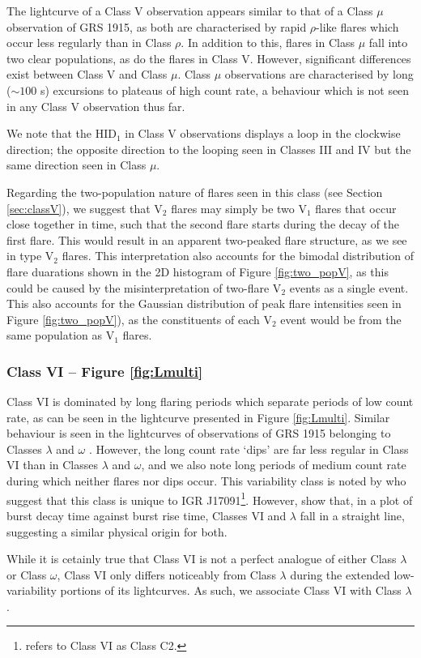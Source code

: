 \par The lightcurve of a Class V observation appears similar to that of a Class $\mu$ observation of GRS 1915, as both are characterised by rapid $\rho$-like flares which occur less regularly than in Class $\rho$.  In addition to this, flares in Class $\mu$ fall into two clear populations, as do the flares in Class V.  However, significant differences exist between Class V and Class $\mu$.  Class $\mu$ observations are characterised by long ($\sim100$ s) excursions to plateaus of high count rate, a behaviour which is not seen in any Class V observation thus far.
\par We note that the HID$_1$ in Class V observations displays a loop in the clockwise direction; the opposite direction to the looping seen in Classes III and IV but the same direction seen in Class $\mu$.
\par Regarding the two-population nature of flares seen in this class (see Section \ref{sec:classV}), we suggest that V$_2$ flares may simply be two V$_1$ flares that occur close together in time, such that the second flare starts during the decay of the first flare.  This would result in an apparent two-peaked flare structure, as we see in type V$_2$ flares.  This interpretation also accounts for the bimodal distribution of flare duarations shown in the 2D histogram of Figure \ref{fig:two_popV}, as this could be caused by the misinterpretation of two-flare V$_2$ events as a single event.  This also accounts for the Gaussian distribution of peak flare intensities seen in Figure \ref{fig:two_popV}), as the constituents of each V$_2$ event would be from the same population as V$_1$ flares.

\subsubsection{Class VI -- Figure \ref{fig:Lmulti}}

\par Class VI is dominated by long flaring periods which separate periods of low count rate, as can be seen in the lightcurve presented in Figure \ref{fig:Lmulti}.  Similar behaviour is seen in the lightcurves of observations of GRS 1915 belonging to Classes $\lambda$ and $\omega$ \citep{KleinWolt_OmegaClass}.  However, the long count rate `dips' are far less regular in Class VI than in Classes $\lambda$ and $\omega$, and we also note long periods of medium count rate during which neither flares nor dips occur.  This variability class is noted by \citet{Pahari_IGRClasses} who suggest that this class is unique to IGR J17091\footnote{\citet{Pahari_IGRClasses} refers to Class VI as Class C2.}.  However, \citet{Pahari_ClassVI} show that, in a plot of burst decay time against burst rise time, Classes VI and $\lambda$ fall in a straight line, suggesting a similar physical origin for both.
\par While it is cetainly true that Class VI is not a perfect analogue of either Class $\lambda$ or Class $\omega$, Class VI only differs noticeably from Class $\lambda$ during the extended low-variability portions of its lightcurves.  As such, we associate Class VI with Class $\lambda$.

